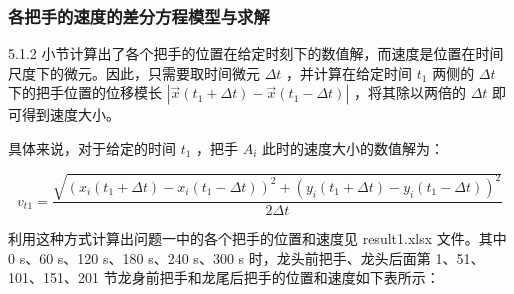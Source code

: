 \documentclass[a4paper]{article}
\begin{document}
	\subsubsection{各把手的速度的差分方程模型与求解}

		5.1.2 小节计算出了各个把手的位置在给定时刻下的数值解，而速度是位置在时间尺度下的微元。因此，只需要取时间微元 $\Delta t$ ，并计算在给定时间 $t_1$ 两侧的 $\Delta t$ 下的把手位置的位移模长 $|\vec{x}(t_1+\Delta t) - \vec{x}(t_1 - \Delta t)|$ ，将其除以两倍的 $\Delta t$ 即可得到速度大小。



		具体来说，对于给定的时间 $t_1$ ，把手 $A_i$ 此时的速度大小的数值解为：

		\begin{equation}
			v_{t1} = \dfrac{\sqrt{(x_i(t_1 + \Delta t) - x_i(t_1 - \Delta t))^2 + (y_i(t_1 + \Delta t) - y_i(t_1 - \Delta t))^2}}{2\Delta t}
		\end{equation}		

		利用这种方式计算出问题一中的各个把手的位置和速度见 result1.xlsx 文件。其中 0 s、60 s、120 s、180 s、240 s、300 s 时，龙头前把手、龙头后面第 1、51、101、151、201 节龙身前把手和龙尾后把手的位置和速度如下表所示：
\end{document}
